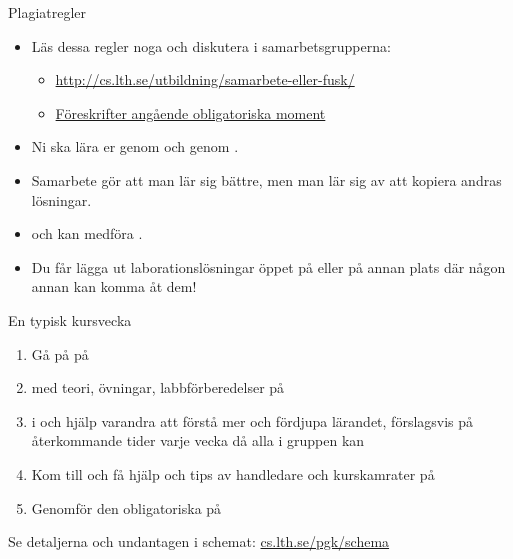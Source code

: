 \begin{SlideExtra}{Plagiatregler}
\begin{itemize}
\item Läs dessa regler noga och diskutera i samarbetsgrupperna:

\begin{itemize}
\footnotesize
\item \url{http://cs.lth.se/utbildning/samarbete-eller-fusk/}
\item \href{http://cs.lth.se/utbildning/foereskrifter-angaaende-obligatoriska-moment/}{Föreskrifter angående obligatoriska moment}
\end{itemize}
\item Ni ska lära er genom  och genom  .
\item Samarbete gör att man lär sig bättre, men man lär sig  av att kopiera andras lösningar.
\item {} och kan medföra .
\item Du får  lägga ut laborationslösningar öppet på  eller på annan plats där någon annan kan komma åt dem!
\end{itemize}

\end{SlideExtra}

\fi %

\begin{Slide}{En typisk kursvecka}
\begin{enumerate}
\item Gå på  på 
\item {}  med teori, övningar, labbförberedelser på  
\item {} i  och hjälp varandra att förstå mer och fördjupa lärandet, förslagsvis på återkommande tider varje vecka då alla i gruppen kan
\item Kom till  och få hjälp och tips av handledare och kurskamrater på 
\item Genomför den obligatoriska  på 
\end{enumerate}
Se detaljerna och undantagen i schemat: \href{http://cs.lth.se/pgk/schema}{cs.lth.se/pgk/schema}
\end{Slide}

